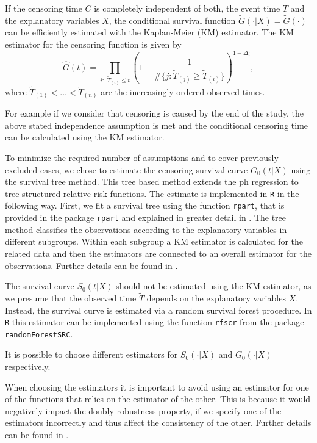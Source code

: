 \documentclass[12pt, a4paper]{scrartcl}
\theoremstyle{definition}
\theoremstyle{plain}
\numberwithin{equation}{section}
\numberwithin{figure}{section}
\numberwithin{table}{section}
\begin{document}
	If the censoring time $C$ is completely independent of both, the event time $T$ and the explanatory variables $X$, the conditional survival function $\tilde{G}(\cdot\vert X)=\tilde{G}(\cdot)$ can be efficiently estimated with the Kaplan-Meier (KM) estimator.
	The KM estimator for the censoring function is given by
	\begin{equation*}
		\hat{G}(t) = \prod_{i:\text{~} \tilde T_{(i)} \leq t} \left(1-\frac{1}{\#\{j: \tilde T_{(j)} \geq\tilde T_{(i)} \}}\right)^{1-\Delta_i},
	\end{equation*}
	where $\tilde T_{(1)}<\dots<\tilde T_{(n)}$ are the increasingly ordered observed times.
	
	For example if we consider that censoring is caused by the end of the study, the above stated independence assumption is met and the conditional censoring time can be calculated using the KM estimator.
	
	To minimize the required number of assumptions and to cover previously excluded cases, we chose to estimate the censoring survival curve $G_0(t \vert X)$ using the survival tree method.
	This tree based method extends the ph regression to tree-structured relative risk functions.
	The estimate is implemented in \texttt{R} in the following way.
	First, we fit a survival tree using the function \texttt{rpart}, that is provided in the package \texttt{rpart} and explained in greater detail in \citet*{rpart}.
	The tree method classifies the observations according to the explanatory variables in different subgroups.
	Within each subgroup a KM estimator is calculated for the related data and then the estimators are connected to an overall estimator for the observations. %
	Further details can be found in \citet*{relativerisktrees}.
	
	The survival curve $S_0(t\vert X)$ should not be estimated using the KM estimator, as we presume that the observed time $\tilde T$ depends on the explanatory variables $X$.
	Instead, the survival curve is estimated via a random survival forest procedure.
	In \texttt{R} this estimator can be implemented using the function \texttt{rfscr} from the package \texttt{randomForestSRC}. 
	
	It is possible to choose different estimators for $S_0(\cdot\vert X)$ and $G_0(\cdot\vert X)$ respectively.
	
	When choosing the estimators it is important to avoid using an estimator for one of the functions that relies on the estimator of the other.
	This is because it would negatively impact the doubly robustness property, if we specify one of the estimators incorrectly and thus affect the consistency of the other.
	Further details can be found in \citet*{drtrees}.
	
\end{document}
